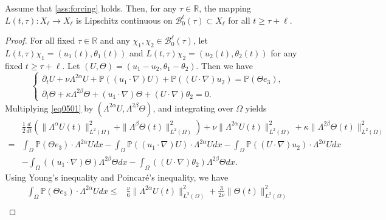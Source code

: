 \documentclass[oneside,preprint,12pt,numbers,sort&compress]{elsarticle}
\begin{document}
\begin{lemma}\label{lem0308}
Assume that \cref{ass:forcing} holds. Then, for any $\tau \in \mathbb{R}$, the mapping $L(t, \tau) : X_\ell \to X_\ell$ is Lipschitz continuous on $\mathcal{B}_0^\ell(\tau) \subset X_\ell$ for all $t \geq \tau + \ell$.  
\end{lemma}
\begin{proof}
For all fixed $\tau \in \mathbb{R}$ and any $\chi_{1}, \chi_{2} \in \mathcal{B}_{0}^{\ell}(\tau)$, let $L(t, \tau)\chi_1 = (u_1(t), \theta_1(t))$ and $L(t, \tau)\chi_2 = (u_2(t), \theta_2(t))$ for any fixed $t \geq \tau + \ell$. Let $(U, \Theta) = (u_1 - u_2, \theta_1 - \theta_2)$. Then we have
\begin{equation}\label{eq0501}
\begin{cases}
\partial_t U + \nu \Lambda^{2\alpha} U + \mathbb{P} \left( (u_1 \cdot \nabla) U \right) + \mathbb{P} \left( (U \cdot \nabla) u_2 \right) = \mathbb{P} (\Theta e_3), \\
\partial_t \Theta + \kappa \Lambda^{2\beta} \Theta + (u_1 \cdot \nabla) \Theta + (U \cdot \nabla) \theta_2 = 0.
\end{cases}
\end{equation}
Multiplying \eqref{eq0501} by $(\Lambda^{2\alpha}U,\Lambda^{2\beta}\Theta)$, and integrating over $\Omega$ yields
\begin{equation}\label{eq0502}
\begin{aligned}
& \frac{1}{2}\frac{d}{dt}
\left( 
\| \Lambda^{\alpha}U(t) \|_{L^2(\Omega)}^{2} + \| \Lambda^{\beta}\Theta (t) \|_{L^2(\Omega)}^{2} 
\right)
+\nu \| \Lambda^{2\alpha}U(t) \|_{L^2(\Omega)}^{2} 
+\kappa \| \Lambda^{2\beta}\Theta(t) \|_{L^2(\Omega)}^{2} 
\\
=
& \int_{\Omega} \mathbb{P} (\Theta e_3) \cdot \Lambda^{2\alpha}U dx
- \int_{\Omega} \mathbb{P} \left( (u_1 \cdot \nabla) U \right) \cdot \Lambda^{2\alpha}U dx
- \int_{\Omega} \mathbb{P} \left( (U \cdot \nabla) u_2 \right) \cdot \Lambda^{2\alpha}U dx\\
&
- \int_{\Omega} \left( (u_1 \cdot \nabla) \Theta \right) \Lambda^{2\beta}\Theta dx
- \int_{\Omega} \left( (U \cdot \nabla) \theta_2 \right) \Lambda^{2\beta}\Theta dx.
\end{aligned}
\end{equation}
Using Young’s inequality and Poincar\'{e}’s inequality, we have
\begin{align*}
\int_{\Omega} \mathbb{P} (\Theta e_3) \cdot \Lambda^{2\alpha} U dx
\leq &
\frac{\nu}{6} \| \Lambda^{2\alpha} U(t) \|_{L^2(\Omega)}^{2} + \frac{3}{2\nu} \| \Theta(t) \|_{L^2(\Omega)}^{2} \\

\end{align*}
\end{proof}
\end{document}
